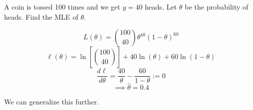 \begin{exbox}
    \begin{example}
        A coin is tossed 100 times and we get $ y=40 $ heads. Let $ \theta $
        be the probability of heads. Find the MLE of $ \theta $.
        
        \[ L(\theta)=\binom{100}{40}\theta^{40}(1-\theta)^{60} \]
        \[ \ell(\theta)=\ln\left[ \binom{100}{40} \right]+40\ln(\theta)+60\ln(1-\theta) \]
        \[ \frac{d\ell}{d\theta}=\frac{40}{\theta} -\frac{60}{1-\theta} :=0 \]
        \[ \implies \hat{\theta}=0.4 \]
    \end{example}
\end{exbox}
We can generalize this further.
